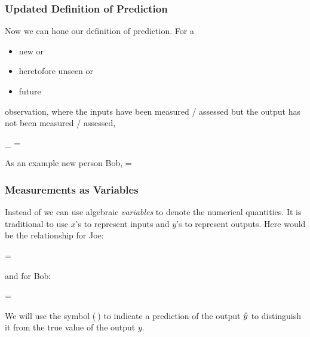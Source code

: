 \documentclass[handout]{beamer}
\begin{document}
\begin{frame}\frametitle{Updated Definition of Prediction}

\small 
Now we can hone our definition of prediction. For a 

\begin{itemize}
\item new or
\item heretofore unseen or
\item future
\end{itemize}

observation, where the inputs have been measured / assessed but the output has not been measured / assessed, \pause 

\beqn
{}_{} = 
\eeqn
 \pause 
 
As an example new person Bob,
\tiny
\beqn
{} = 
\eeqn
\normalsize


\end{frame}


\begin{frame}\frametitle{Measurements as Variables}

Instead of  we can use algebraic \textit{variables} to denote the numerical quantities.  \pause It is traditional to use $x$'s to represent inputs and $y$'s to represent outputs.  \pause Here would be the relationship for Joe:


\beqn
{} = 
\eeqn

and for Bob: \pause 


\beqn
{} = 
\eeqn

We will use the  symbol ($\hat{~}$) to indicate a prediction of the output $\hat{y}$ to distinguish it from the true value of the output $y$.

\end{frame}
\end{document}
